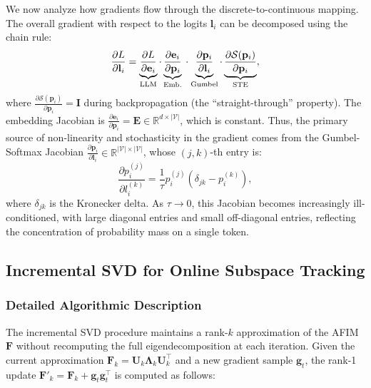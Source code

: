 ﻿\documentclass[lettersize,journal]{IEEEtran}
\begin{document}
We now analyze how gradients flow through the discrete-to-continuous mapping. The overall gradient with respect to the logits $\mathbf{l}_i$ can be decomposed using the chain rule:
\begin{equation}
\label{eq:chain_rule}
\frac{\partial L}{\partial \mathbf{l}_i} = \underbrace{\frac{\partial L}{\partial \mathbf{e}_i}}_{\text{LLM}} \cdot \underbrace{\frac{\partial \mathbf{e}_i}{\partial \mathbf{p}_i}}_{\text{Emb.}} \\\\
\cdot \underbrace{\frac{\partial \mathbf{p}_i}{\partial \mathbf{l}_i}}_{\text{Gumbel}} \cdot \underbrace{\frac{\partial \mathcal{S}(\mathbf{p}_i)}{\partial \mathbf{p}_i}}_{\text{STE}},
\end{equation}
where $\frac{\partial \mathcal{S}(\mathbf{p}_i)}{\partial \mathbf{p}_i} = \mathbf{I}$ during backpropagation (the ``straight-through'' property). The embedding Jacobian is $\frac{\partial \mathbf{e}_i}{\partial \mathbf{p}_i} = \mathbf{E} \in \mathbb{R}^{d \times |\mathcal{V}|}$, which is constant. Thus, the primary source of non-linearity and stochasticity in the gradient comes from the Gumbel-Softmax Jacobian $\frac{\partial \mathbf{p}_i}{\partial \mathbf{l}_i} \in \mathbb{R}^{|\mathcal{V}| \times |\mathcal{V}|}$, whose $(j, k)$-th entry is:
\begin{equation}
\label{eq:softmax_jacobian}
\frac{\partial p_i^{(j)}}{\partial l_i^{(k)}} = \frac{1}{\tau} p_i^{(j)} \left(\delta_{jk} - p_i^{(k)}\right),
\end{equation}
where $\delta_{jk}$ is the Kronecker delta. As $\tau \to 0$, this Jacobian becomes increasingly ill-conditioned, with large diagonal entries and small off-diagonal entries, reflecting the concentration of probability mass on a single token.

\subsection{Incremental SVD for Online Subspace Tracking}
\label{sec:incremental_svd}

\subsubsection{Detailed Algorithmic Description}
\label{sec:incsvd_detail}

The incremental SVD procedure maintains a rank-$k$ approximation of the AFIM $\mathbf{F}$ without recomputing the full eigendecomposition at each iteration. Given the current approximation $\mathbf{F}_k = \mathbf{U}_k \boldsymbol{\Lambda}_k \mathbf{U}_k^\top$ and a new gradient sample $\mathbf{g}_t$, the rank-1 update $\mathbf{F}'_k = \mathbf{F}_k + \mathbf{g}_t \mathbf{g}_t^\top$ is computed as follows:
\end{document}
